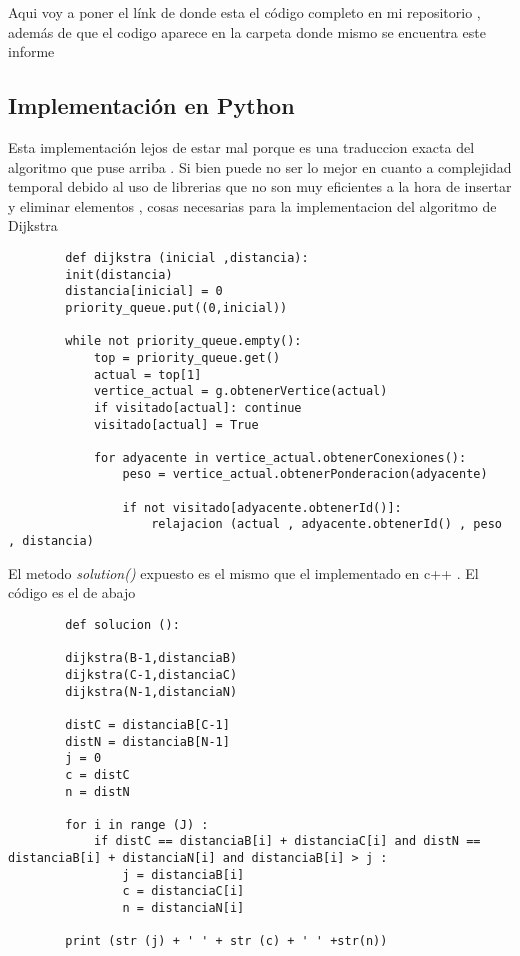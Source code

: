 \documentclass[10pt]{article}
\begin{document}
    \noindent Aqui voy a poner el l\'ink de donde esta el c\'odigo completo en mi repositorio  , adem\'as de que el codigo aparece en la carpeta donde mismo se encuentra este informe 
    
    \subsection{Implementaci\'on  en Python }
    
    \noindent Esta implementaci\'on  lejos de estar mal porque es una traduccion exacta del algoritmo que puse arriba  . Si bien puede no ser lo mejor en cuanto a complejidad temporal debido al uso de 
    librerias que no son muy eficientes a la hora de insertar y  eliminar elementos , cosas necesarias para la implementacion del algoritmo de Dijkstra 
    
    \begin{verbatim}
        def dijkstra (inicial ,distancia):
        init(distancia)
        distancia[inicial] = 0
        priority_queue.put((0,inicial))
        
        while not priority_queue.empty():
            top = priority_queue.get()
            actual = top[1]
            vertice_actual = g.obtenerVertice(actual)
            if visitado[actual]: continue 
            visitado[actual] = True

            for adyacente in vertice_actual.obtenerConexiones():
                peso = vertice_actual.obtenerPonderacion(adyacente)

                if not visitado[adyacente.obtenerId()]:
                    relajacion (actual , adyacente.obtenerId() , peso , distancia)    
    \end{verbatim} 

    \noindent El metodo \textit{solution()} expuesto es el mismo que el implementado en c++ . El c\'odigo es el de abajo 
    
    \begin{verbatim}
        def solucion ():

        dijkstra(B-1,distanciaB)
        dijkstra(C-1,distanciaC)
        dijkstra(N-1,distanciaN)
        
        distC = distanciaB[C-1] 
        distN = distanciaB[N-1]
        j = 0 
        c = distC
        n = distN

        for i in range (J) :
            if distC == distanciaB[i] + distanciaC[i] and distN == distanciaB[i] + distanciaN[i] and distanciaB[i] > j :
                j = distanciaB[i]
                c = distanciaC[i]
                n = distanciaN[i] 

        print (str (j) + ' ' + str (c) + ' ' +str(n))
    \end{verbatim}
\end{document}
